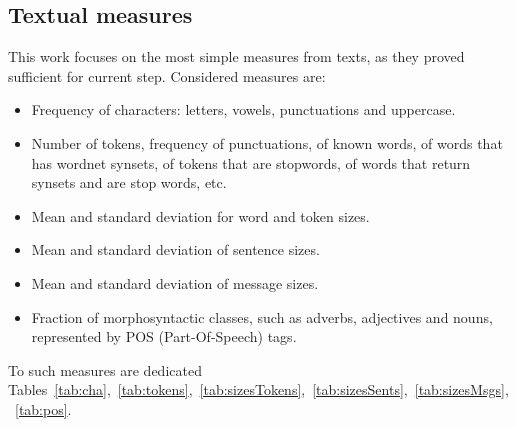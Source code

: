 \documentclass[%
 aip,
 jmp,%
 amsmath,amssymb,
 reprint,%
]{revtex4-1}
\begin{document}
%


\subsection{Textual measures}
This work focuses on the most simple measures from texts, as they proved sufficient for current step.
Considered measures are:
\begin{itemize}
    \item Frequency of characters: letters, vowels, punctuations and uppercase.
    \item Number of tokens, frequency of punctuations, of known words, of words that has wordnet synsets, of tokens that are stopwords, of words that return synsets and are stop words, etc.
    \item Mean and standard deviation for word and token sizes.
    \item Mean and standard deviation of sentence sizes.
    \item Mean and standard deviation of message sizes.
    \item Fraction of morphosyntactic classes, such as adverbs, adjectives and nouns, represented by POS (Part-Of-Speech) tags.
\end{itemize}
\noindent To such measures are dedicated Tables~\ref{tab:cha},~\ref{tab:tokens},~\ref{tab:sizesTokens},~\ref{tab:sizesSents},~\ref{tab:sizesMsgs},~\ref{tab:pos}.
\end{document}
